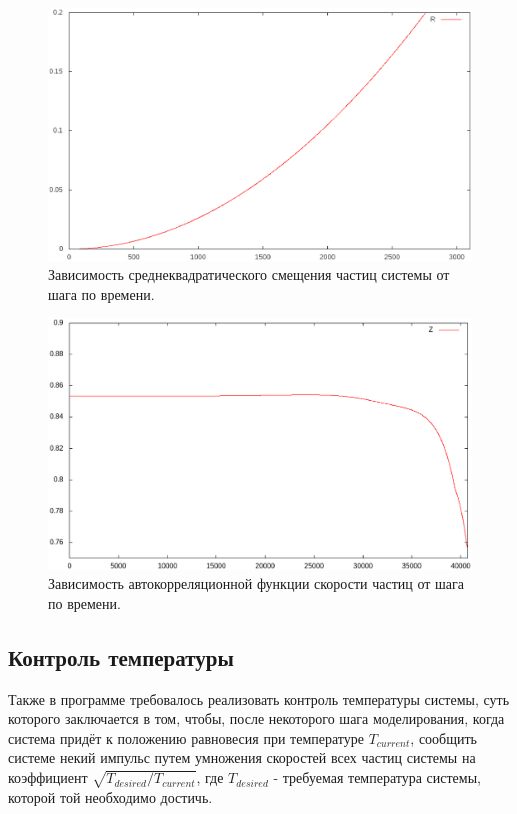 \documentclass[14pt,a4paper,report]{ncc}
\begin{document}
\begin{figure}[!h]
\includegraphics[scale=0.6]{R380eps}
\caption{Зависимость среднеквадратического смещения частиц системы от шага по времени.}
\end{figure}
\begin{figure}[!h]
\includegraphics[scale=0.6]{Zeps}
\caption{Зависимость автокорреляционной функции скорости частиц от шага по времени.}
\end{figure}

\subsection{Контроль температуры}
Также в программе требовалось реализовать контроль температуры системы, суть которого заключается в том, чтобы, после некоторого шага моделирования, когда система придёт к положению равновесия при температуре $T_{current}$, сообщить системе некий импульс путем умножения скоростей всех частиц системы на коэффициент $\sqrt{{T_{desired}}/{T_{current}}}$, где $T_{desired}$ - требуемая температура системы, которой той необходимо достичь.
\
\end{document}
